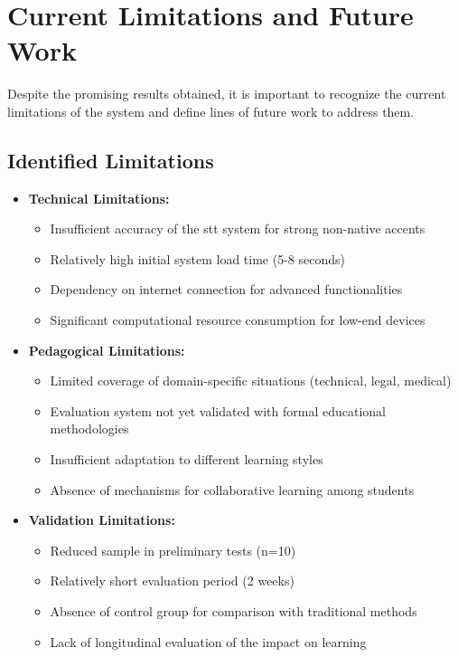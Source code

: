 \section{Current Limitations and Future Work}
\label{sec:limitaciones-trabajo-futuro}

Despite the promising results obtained, it is important to recognize the current limitations of the system and define lines of future work to address them.

\subsection{Identified Limitations}
\label{subsec:limitaciones-identificadas}

\begin{itemize}
    \item \textbf{Technical Limitations:}
    \begin{itemize}
        \item Insufficient accuracy of the \gls{stt} system for strong non-native accents
        \item Relatively high initial system load time (5-8 seconds)
        \item Dependency on internet connection for advanced functionalities
        \item Significant computational resource consumption for low-end devices
    \end{itemize}

    \item \textbf{Pedagogical Limitations:}
    \begin{itemize}
        \item Limited coverage of domain-specific situations (technical, legal, medical)
        \item Evaluation system not yet validated with formal educational methodologies
        \item Insufficient adaptation to different learning styles
        \item Absence of mechanisms for collaborative learning among students
    \end{itemize}

    \item \textbf{Validation Limitations:}
    \begin{itemize}
        \item Reduced sample in preliminary tests (n=10)
        \item Relatively short evaluation period (2 weeks)
        \item Absence of control group for comparison with traditional methods
        \item Lack of longitudinal evaluation of the impact on learning
    \end{itemize}
\end{itemize}


